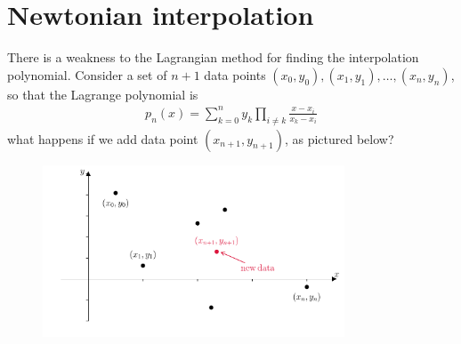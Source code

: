 





\section{Newtonian interpolation}
There is a weakness to the Lagrangian method for finding the interpolation polynomial. Consider a set of $n+1$ data points $(x_0,y_0), (x_1,y_1), \dots, (x_n,y_n)$, so that the Lagrange polynomial is
\begin{align*}
p_n(x) = \sum_{k=0}^n y_k \prod_{i\neq k} \frac{x-x_i}{x_k-x_i} 
\end{align*}
what happens if we add data point $(x_{n+1},y_{n+1})$, as pictured below?
\begin{figure}[H]
	\begin{center}
	\includegraphics[width=0.8\textwidth]{figures/ch3_newton_purpose.pdf} 
	  \caption{} \label{fig:ch3_newton_purpose}
	\end{center}
\end{figure}

